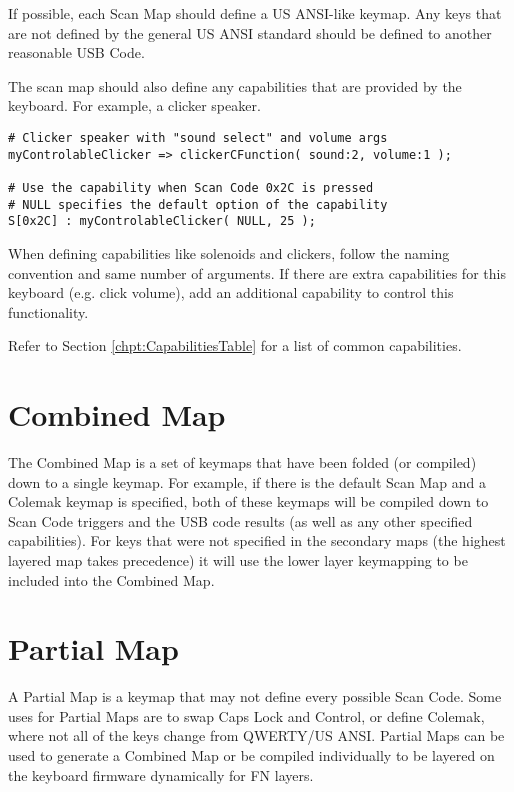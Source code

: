 \documentclass{kiibohd-template}
\begin{document}
If possible, each Scan Map should define a US ANSI-like keymap.
Any keys that are not defined by the general US ANSI standard should be defined to another reasonable USB Code.

The scan map should also define any capabilities that are provided by the keyboard.
For example, a clicker speaker.

\begin{lstlisting}
# Clicker speaker with "sound select" and volume args
myControlableClicker => clickerCFunction( sound:2, volume:1 );

# Use the capability when Scan Code 0x2C is pressed
# NULL specifies the default option of the capability
S[0x2C] : myControlableClicker( NULL, 25 );
\end{lstlisting}

When defining capabilities like solenoids and clickers, follow the naming convention and same number of arguments.
If there are extra capabilities for this keyboard (e.g. click volume), add an additional capability to control this functionality.

Refer to Section \ref{chpt:CapabilitiesTable} for a list of common capabilities.


\section{Combined Map}

The Combined Map is a set of keymaps that have been folded (or compiled) down to a single keymap.
For example, if there is the default Scan Map and a Colemak keymap is specified, both of these keymaps will be compiled down to Scan Code triggers and the USB code results (as well as any other specified capabilities).
For keys that were not specified in the secondary maps (the highest layered map takes precedence) it will use the lower layer keymapping to be included into the Combined Map.


\section{Partial Map}

A Partial Map is a keymap that may not define every possible Scan Code.
Some uses for Partial Maps are to swap Caps Lock and Control, or define Colemak, where not all of the keys change from QWERTY/US ANSI.
Partial Maps can be used to generate a Combined Map or be compiled individually to be layered on the keyboard firmware dynamically for FN layers.
\end{document}
